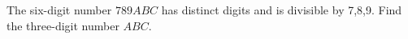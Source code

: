 The six-digit number $ 789ABC $ has distinct digits and is divisible by 7,8,9. Find the three-digit number $ ABC $.
